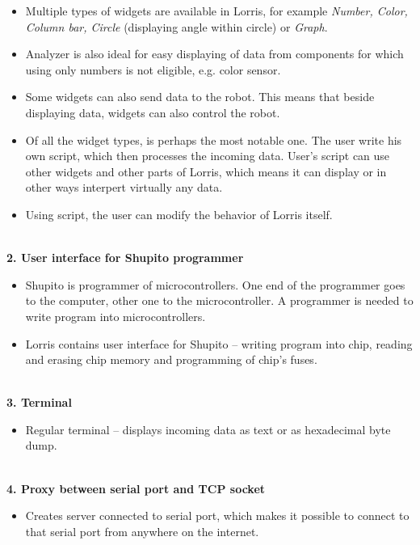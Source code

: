 \documentclass[17pt]{extreport}
\newcommand{\B}{\textbf} %
\newcommand{\It}{\textit}  %
\begin{document}
\vspace{-7mm}
\begin{itemize} 
    \item Multiple types of widgets are available in Lorris, for example \It{Number, Color, Column bar, Circle} (displaying angle within circle) or \It{Graph}.
    \item Analyzer is also ideal for easy displaying of data from components for which using only numbers is not eligible, e.g. color sensor.
    \item Some widgets can also send data to the robot. This means that beside displaying data, widgets can also control the robot.
    \item Of all the widget types,  is perhaps the most notable one. The user write his own script, which then processes the incoming data. User's script can use other widgets and other parts of Lorris, which means it can display or in other ways interpert virtually any data.
    \item Using script, the user can modify the behavior of Lorris itself.
\end{itemize}
\\{\large \B{ 2. User interface for Shupito programmer }}
\begin{itemize}
    \item Shupito is programmer of microcontrollers. One end of the programmer goes to the computer, other one to the microcontroller. A programmer is needed to write program into microcontrollers.
    \item Lorris contains user interface for Shupito -- writing program into chip, reading and erasing chip memory and programming of chip's fuses.
\end{itemize}
\\{\large \B{ 3. Terminal }}
\begin{itemize}
    \item Regular terminal -- displays incoming data as text or as hexadecimal byte dump.
\end{itemize}
\\{\large \B{ 4. Proxy between serial port and TCP socket}}
\begin{itemize}
    \item Creates server connected to serial port, which makes it possible to connect to that serial port from anywhere on the internet.
\end{itemize}
\end{document}
